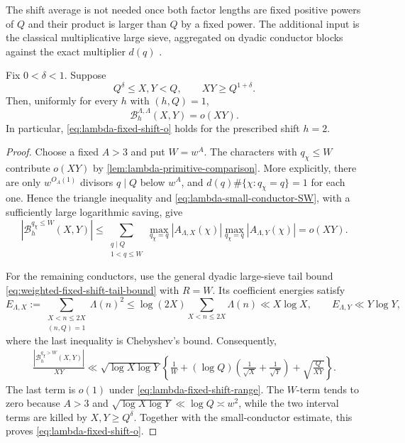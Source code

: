 The shift average is not needed once both factor lengths are fixed positive
powers of $Q$ and their product is larger than $Q$ by a fixed power.  The
additional input is the classical
multiplicative large sieve, aggregated on dyadic conductor blocks against the
exact multiplier $d(q)$ \citep{MontgomeryVaughan1973,IwaniecKowalski2004}.

\begin{theorem}
\label{thm:lambda-fixed-shift}
Fix $0<\delta<1$.  Suppose
\begin{equation}
 Q^\delta\le X,Y<Q,
 \qquad
 XY\ge Q^{1+\delta}.
 \label{eq:lambda-fixed-shift-range}
\end{equation}
Then, uniformly for every $h$ with $(h,Q)=1$,
\begin{equation}
 \mathcal B_h^{\Lambda,\Lambda}(X,Y)=o(XY).
 \label{eq:lambda-fixed-shift-o}
\end{equation}
In particular, \eqref{eq:lambda-fixed-shift-o} holds for the prescribed shift
$h=2$.
\end{theorem}

\begin{proof}
Choose a fixed $A>3$ and put $W=w^A$.  The characters with
$q_\chi\le W$ contribute $o(XY)$ by
\cref{lem:lambda-primitive-comparison}.  More explicitly, there are only
$w^{O_A(1)}$ divisors $q\mid Q$ below $w^A$, and
$d(q)\#\{\chi:q_\chi=q\}=1$ for each one.  Hence the triangle inequality and
\eqref{eq:lambda-small-conductor-SW}, with a sufficiently large logarithmic
saving, give
\[
 |\mathcal B_h^{q_\chi\le W}(X,Y)|
 \le \sum_{\substack{q\mid Q\\1<q\le W}}
 \max_{q_\chi=q}|A_{\Lambda,X}(\chi)|
 \max_{q_\chi=q}|A_{\Lambda,Y}(\chi)|
 =o(XY).
\]

For the remaining conductors, use the general dyadic large-sieve tail bound
\eqref{eq:weighted-fixed-shift-tail-bound} with $R=W$.  Its coefficient
energies satisfy
\begin{equation}
 E_{\Lambda,X}
 :=\sum_{\substack{X<n\le2X\\(n,Q)=1}}\Lambda(n)^2
 \le \log(2X)\sum_{X<n\le2X}\Lambda(n)
 \ll X\log X,
 \qquad
 E_{\Lambda,Y}\ll Y\log Y,
 \label{eq:lambda-second-moments}
\end{equation}
where the last inequality is Chebyshev's bound.  Consequently,
\begin{align}
 \frac{|\mathcal B_h^{q_\chi>W}(X,Y)|}{XY}
 \ll \sqrt{\log X\log Y}\left\{
  \frac1W
  +(\log Q)\left(\frac1{\sqrt X}+\frac1{\sqrt Y}\right)
  +\sqrt{\frac Q{XY}}
 \right\}.
 \label{eq:lambda-fixed-large-conductors}
\end{align}
The last term is $o(1)$ under
\eqref{eq:lambda-fixed-shift-range}.  The $W$-term tends to zero because
$A>3$ and $\sqrt{\log X\log Y}\ll\log Q\asymp w^2$, while the two interval
terms are killed by $X,Y\ge Q^\delta$.  Together with the small-conductor
estimate, this proves \eqref{eq:lambda-fixed-shift-o}.
\end{proof}

